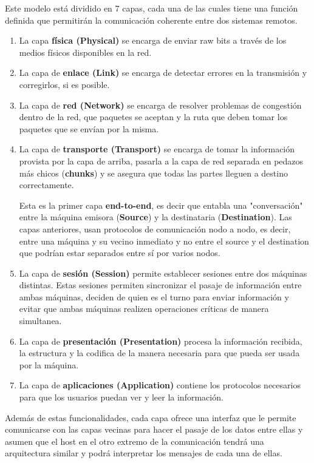 Este modelo está dividido en 7 capas, cada una de las cuales tiene una función definida que permitirán la comunicación coherente entre dos sistemas remotos.  

\begin{enumerate}
  \item La capa \textbf{física (Physical)} se encarga de enviar raw bits a través de los medios físicos disponibles en la red. 
  \item La capa de \textbf{enlace (Link)} se encarga de detectar errores en la transmisión y corregirlos, si es posible.
  \item La capa de \textbf{red (Network)} se encarga de resolver problemas de congestión dentro de la red, que paquetes se aceptan y la ruta que deben tomar los paquetes que se envían por la misma.
  \item La capa de \textbf{transporte (Transport)} se encarga de tomar la información provista por la capa de arriba, pasarla a la capa de red separada en pedazos más chicos (\textbf{chunks}) y se asegura que todas las partes lleguen a destino correctamente. 
  
  Esta es la primer capa \textbf{end-to-end}, es decir que entabla una "conversación" entre la máquina emisora (\textbf{Source}) y la destinataria (\textbf{Destination}). Las capas anteriores, usan protocolos de comunicación nodo a nodo, es decir, entre una máquina y su vecino inmediato y no entre el source y el destination que podrían estar separados entre sí por varios nodos.
  
  \item La capa de \textbf{sesión  (Session)} permite establecer sesiones entre dos máquinas distintas. Estas sesiones permiten sincronizar el pasaje de información entre ambas máquinas, deciden de quien es el turno para enviar información y evitar que ambas máquinas realizen operaciones críticas de manera simultanea.
  \item La capa de \textbf{presentación (Presentation)} procesa la información recibida, la estructura y la codifica de la manera necesaria para que pueda ser usada por la máquina.
  \item La capa de \textbf{aplicaciones (Application)} contiene los protocolos necesarios para que los usuarios puedan ver y leer la información.
\end{enumerate}

Además de estas funcionalidades, cada capa ofrece una interfaz que le permite comunicarse con las capas vecinas para hacer el pasaje de los datos entre ellas y asumen que el host en el otro extremo de la comunicación tendrá una arquitectura similar y podrá interpretar los mensajes de cada una de ellas.

